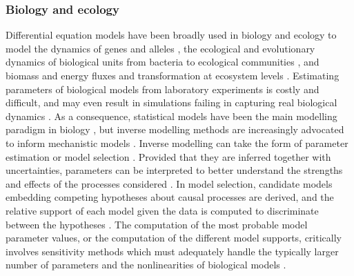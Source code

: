 \subsubsection{Biology and ecology}

Differential equation models have been broadly used in biology and ecology to model the dynamics of genes and alleles \cite{Page2002}, the ecological and evolutionary dynamics of biological units from bacteria to ecological communities \cite{Gabor2015,Lion2018,Villa2021,Boussange2022,boussange2023a, Akesson2021,chalmandrier2021,VandenBerg2022}, and biomass and energy fluxes and transformation at ecosystem levels \cite{Weng2015,Schartau2017,Franklin2020,Geary2020}.
Estimating parameters of biological models from laboratory experiments is costly and difficult\cite{Schartau2017}, and may even result in simulations failing in capturing real biological dynamics \cite{Watts2001}. 
As a consequence, statistical models have been the main modelling paradigm in biology \cite{zimmermann2010}, but inverse modelling methods are increasingly advocated to inform mechanistic models \cite{hartig2012,alsos2023,pantel2023}.
Inverse modelling can take the form of parameter estimation \cite{Schartau2017} or model selection \cite{Johnson2004}.
Provided that they are inferred together with uncertainties, parameters can be interpreted to better understand the strengths and effects of the processes considered \cite{Pontarp2019,Higgins2010,Curtsdotter2019,godwin2020}.
In model selection, candidate models embedding competing hypotheses about causal processes are derived, and the relative support of each model given the data is computed to discriminate between the hypotheses \cite{Johnson2004,alsos2023}.
The computation of the most probable model parameter values, or the computation of the different model supports, critically involves sensitivity methods which must adequately handle the typically larger number of parameters and the nonlinearities of biological models \cite{Gabor2015}.

